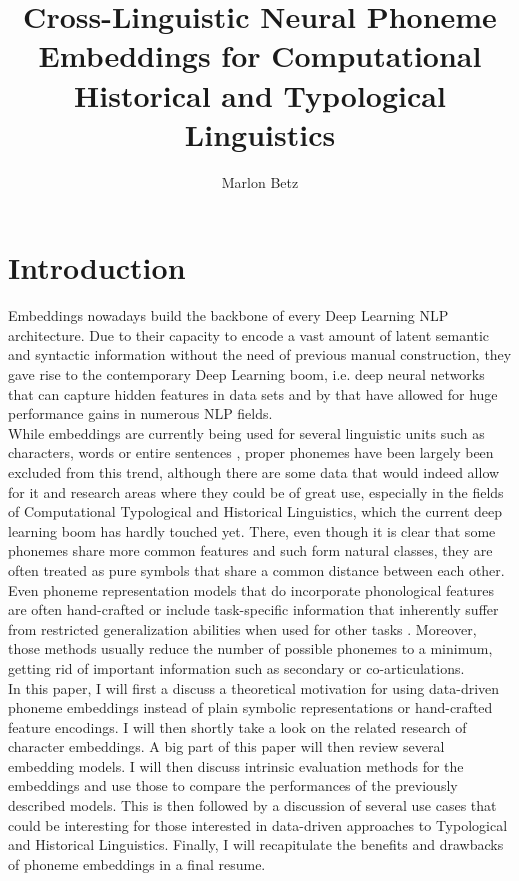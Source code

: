 \documentclass[11pt]{article}
\title{Cross-Linguistic Neural Phoneme Embeddings for Computational Historical and Typological Linguistics}
\author{Marlon Betz}
\begin{document}
\maketitle
\newpage
\tableofcontents

\section{Introduction}
Embeddings nowadays build the backbone of every Deep Learning NLP architecture. Due to their capacity to encode a vast amount of latent semantic and syntactic information without the need of previous manual construction, they gave rise to the contemporary Deep Learning boom, i.e. deep neural networks that can capture hidden features in data sets and by that have allowed for huge performance gains in numerous NLP fields. \\While embeddings are currently being used for several linguistic units such as characters\cite{kim2015character,dos2014learning,zhang2015character}, words \cite{mikolov2013efficient,mikolov2013distributed,pennington2014glove} or entire sentences \cite{kiros2015skip}, proper phonemes have been largely been excluded from this trend, although there are some data that would indeed allow for it and research areas where they could be of great use, especially in the fields of Computational Typological and Historical Linguistics, which the current deep learning boom has hardly touched yet. There, even though it is clear that some phonemes share more common features and such form natural classes, they are often treated as pure symbols that share a common distance between each other. Even phoneme representation models that do incorporate phonological features are often hand-crafted \cite{kondrak2000new,rama2016siamese} or include task-specific information that inherently suffer from restricted generalization abilities when used for other tasks \cite{jager2014phylogenetic}. Moreover, those methods usually reduce the number of possible phonemes to a minimum, getting rid of important information such as secondary or co-articulations. \\
In this paper, I will first a discuss a theoretical motivation for using data-driven phoneme embeddings instead of plain symbolic representations or hand-crafted feature encodings. I will then shortly take a look on the related research of character embeddings. A big part of this paper will then review several embedding models. I will then discuss intrinsic evaluation methods for the embeddings and use those to compare the performances of the previously described models. This is then followed by a discussion of several use cases that could be interesting for those interested in data-driven approaches to Typological and Historical Linguistics. Finally, I will recapitulate the benefits and drawbacks of phoneme embeddings in a final resume.
\end{document}
